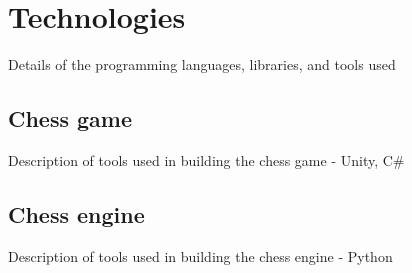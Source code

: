 \chapter{Technologies}
\label{chap:ch4}

Details of the programming languages, libraries, and tools used

\section{Chess game}
\label{sec:ch4sec1}

\par Description of tools used in building the chess game - Unity, C\#

\section{Chess engine}
\label{sec:ch4sec2}

\par Description of tools used in building the chess engine - Python